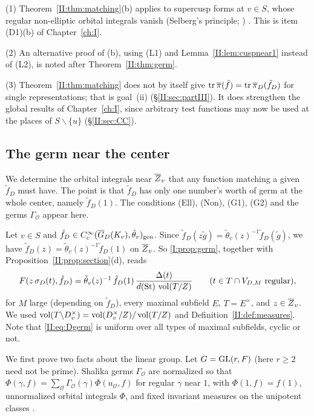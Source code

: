\begin{remark}
(1) Theorem~\ref{II:thm:matching}(b) applies to supercusp forms at $v\in S$, whose regular non-elliptic orbital integrals vanish (Selberg's principle; \cite[\S13(i)]{FK86}) \Ev. This is item (D1)(b) of Chapter~\ref{ch:I}.

(2) An alternative proof of (b), using (L1) and Lemma~\ref{II:lem:cuspnear1} instead of (L2), is noted after Theorem~\ref{II:thm:germ}.

(3) Theorem~\ref{II:thm:matching} does not by itself give $\operatorname{tr}\overline{\pi}(\tilde f)=\operatorname{tr}\overline{\pi}_D(\tilde f_D)$ for single representations; that is goal~(ii) (\S\ref{II:sec:partIII}). It does strengthen the global results of Chapter~\ref{ch:I}, since arbitrary test functions may now be used at the places of $S\smallsetminus\{u\}$ (\S\ref{II:sec:CC}).
\end{remark}


\subsection{The germ near the center}\label{II:subsec:germ}
We determine the orbital integrals near $\overline{Z}_v$ that any function matching a given $\tilde f_D$ must have. The point is that $\tilde f_D$ has only one number's worth of germ at the whole center, namely $\tilde f_D(1)$. The conditions (Ell), (Non), (G1), (G2) and the germs $\Gamma_{\mathcal O}$ appear here.

Let $v\in S$ and $\tilde f_D\in C_c^\infty(\overline{G}_D(K_v),\tilde\theta_v)_{\mathrm{gen}}$. Since $\tilde f_D(z\tilde g)=\tilde\theta_v(z)^{-1}\tilde f_D(\tilde g)$, we have $\tilde f_D(z)=\tilde\theta_v(z)^{-1}\tilde f_D(1)$ on $\overline{Z}_v$. So \cref{I:prop:germ}, together with Proposition~\ref{II:prop:section}(d), reads
\begin{equation}\label{II:eq:Dgerm}
F(z\,\sigma_D(t),\tilde f_D)=\tilde\theta_v(z)^{-1}\,\tilde f_D(1)\,\frac{\Delta(t)}{d(\mathrm{St})\,\operatorname{vol}(T/Z)}\qquad(t\in T\cap V_{D,M}\text{ regular}),
\end{equation}
for $M$ large (depending on $\tilde f_D$), every maximal subfield $E$, $T=E^\times$, and $z\in\overline{Z}_v$. We used $\operatorname{vol}(T\backslash D_v^\times)=\operatorname{vol}(D_v^\times/Z)/\operatorname{vol}(T/Z)$ and Definition~\ref{II:def:measures}. Note that \eqref{II:eq:Dgerm} is uniform over all types of maximal subfields, cyclic or not.


We first prove two facts about the linear group. Let $G=\mathrm{GL}(r,F)$ (here $r\ge2$ need not be prime). Shalika germs $\Gamma_{\mathcal O}$ are normalized so that $\Phi(\gamma,f)=\sum_{\mathcal O}\Gamma_{\mathcal O}(\gamma)\Phi(u_{\mathcal O},f)$ for regular $\gamma$ near $1$, with $\Phi(1,f)=f(1)$, unnormalized orbital integrals $\Phi$, and fixed invariant measures on the unipotent classes \cite{Sha72}.

